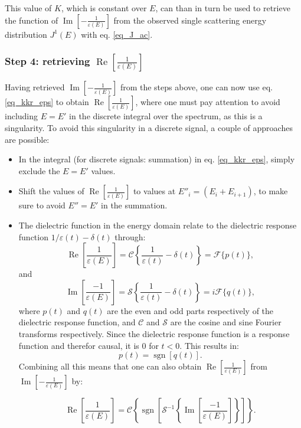 This value of $K$, which is constant over $E$, can than in turn be used to retrieve the function of $\operatorname{Im}\left[-\frac{1}{\varepsilon(E)}\right]$ from the observed single scattering energy distribution $J^1(E)$ with eq. \eqref{eq_J_ac}.


\subsubsection{Step 4: retrieving $\operatorname{Re}\left[\frac{1}{\varepsilon(E)}\right]$ }
Having retrieved $\operatorname{Im}\left[-\frac{1}{\varepsilon(E)}\right]$ from the steps above, one can now use eq. \eqref{eq_kkr_eps} to obtain $\operatorname{Re}\left[\frac{1}{\varepsilon(E)}\right]$, where one must pay attention to avoid including $E=E'$ in the discrete integral over the spectrum, as this is a singularity. To avoid this singularity in a discrete signal, a couple of approaches are possible:
\begin{itemize}
    \item In the integral (for discrete signals: summation) in eq. \eqref{eq_kkr_eps}, simply exclude the $E = E'$ values.
    \item Shift the values of $\operatorname{Re}\left[\frac{1}{\varepsilon(E)}\right]$ to values at $E''_i = (E_i + E_{i+1})$, to make sure to avoid $E'' = E'$ in the summation.
    \item  The dielectric function in the energy domain relate to the dielectric response function $1/\varepsilon(t) -\delta(t)$ through:
    \begin{equation}
        \operatorname{Re}\left[\frac{1}{\varepsilon(E)}\right] = \mathcal{C}\left\{\frac{1}{\varepsilon(t)} - \delta(t)\right\} = \mathcal{F}\{p(t)\},
    \end{equation}
    and 
    \begin{equation}
        \operatorname{Im}\left[\frac{-1}{\varepsilon(E)}\right] = \mathcal{S}\left\{\frac{1}{\varepsilon(t)} - \delta(t)\right\} = i\mathcal{F}\{q(t)\},
    \end{equation}
    where $p(t)$ and $q(t)$ are the even and odd parts respectively of the dielectric response function, and $\mathcal{C}$ and $\mathcal{S}$ are the cosine and sine Fourier transforms respectively. Since the dielectric response function is a response function and therefor causal, it is $0$ for $t<0$. This results in:
    \begin{equation}
        p(t) = \operatorname{sgn}[q(t)].
    \end{equation}
    Combining all this means that one can also obtain $\operatorname{Re}\left[\frac{1}{\varepsilon(E)}\right]$ from $\operatorname{Im}\left[-\frac{1}{\varepsilon(E)}\right]$ by:
    
    \begin{equation}
        \operatorname{Re}\left[\frac{1}{\varepsilon(E)}\right] =\mathcal{C}\left\{\operatorname{sgn}\left[\mathcal{S}^{-1}\left\{\operatorname{Im}\left[\frac{-1}{ \varepsilon(E)}\right]\right\}\right]\right\}.
    \end{equation}
\end{itemize}

